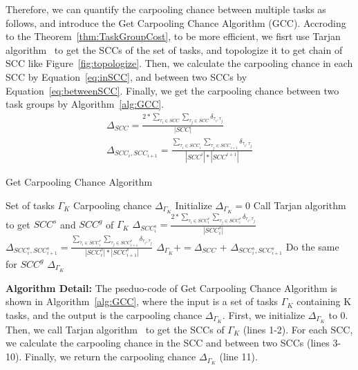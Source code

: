 \documentclass[sigconf,anonymous]{aamas}
\begin{document}
Therefore, we can quantify the carpooling chance between multiple tasks as follows,
and introduce the Get Carpooling Chance Algorithm (GCC).
Accroding to the Theorem~\ref{thm:TaskGroupCost},
to be more efficient,
we fisrt use Tarjan algorithm~\cite{tarjan1972depth} to get the SCCs of the set of tasks,
and topologize it to get chain of SCC like Figure~\ref{fig:topologize}.
Then, we calculate the carpooling chance in each SCC by Equation~\ref{eq:inSCC},
and between two SCCs by Equation~\ref{eq:betweenSCC}.
Finally, we get the carpooling chance between two task groups by Algorithm~\ref{alg:GCC}.
\begin{eqnarray}
  \label{eq:inSCC}
    \Delta_{SCC} =\frac{2 {\ast} \sum_{\tau_i \in SCC}{\sum_{\tau_j \in SCC}{\delta_{\tau_i, \tau_j}}} }
    {|SCC|}\\
  \label{eq:betweenSCC}
    \Delta_{SCC_i, SCC_{i+1}} = \frac{\sum_{\tau_i \in SCC_i}{\sum_{\tau_j \in SCC_{i+1}}{\delta_{\tau_i, \tau_j}}} }
    {|SCC^i|{\ast}|SCC^{i+1}|}
\end{eqnarray}

\begin{algorithm}[htbp]
\caption{Get Carpooling Chance Algorithm}
\label{alg:GCC}
\begin{algorithmic}[1]
\Require Set of tasks $\Gamma_K$ %
\Ensure Carpooling chance $\Delta_{\Gamma_K}$ %
\State Initialize $\Delta_{\Gamma_K} = 0$
\State Call Tarjan algorithm to get $SCC^s$ and $SCC^g$ of $\Gamma_K$
    \State $\Delta_{SCC^s_i} =\frac{2 {\ast} \sum_{\tau_i \in SCC^s_{i}}{\sum_{\tau_j \in SCC^s_{i}}{\delta_{\tau_i, \tau_j}}} }
    {|SCC^s_{i}|}$
        \State $\Delta_{SCC^s_i, SCC^s_{i+1}} = \frac{\sum_{\tau_i \in SCC^s_i}{\sum_{\tau_j \in SCC^s_{i+1}}{\delta_{\tau_i, \tau_j}}} }
        {|SCC^s_i|{\ast}|SCC^s_{i+1}|}$
    \EndIf
    \State $\Delta_{\Gamma_K} += \Delta_{SCC}$ + $\Delta_{SCC^s_i, SCC^s_{i+1}}$
\EndFor
\State Do the same for $SCC^g$
\State \Return $\Delta_{\Gamma_K}$
\end{algorithmic}
\end{algorithm}

\textbf{Algorithm Detail:} 
The pseduo-code of Get Carpooling Chance Algorithm is shown in Algorithm~\ref{alg:GCC},
where the input is a set of tasks $\Gamma_K$ containing K tasks,
and the output is the carpooling chance $\Delta_{\Gamma_K}$.
First, we initialize $\Delta_{\Gamma_K}$ to 0.
Then, we call Tarjan algorithm~\cite{tarjan1972depth} to get the SCCs of $\Gamma_K$ (lines 1-2).
For each SCC, we calculate the carpooling chance in the SCC and between two SCCs (lines 3-10).
Finally, we return the carpooling chance $\Delta_{\Gamma_K}$ (line 11).
\end{document}

